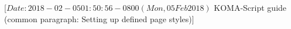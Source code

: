 %
%
%
%
%
%
%
%
% 
%
%
%
%

                 [$Date: 2018-02-05 01:50:56 -0800 (Mon, 05 Feb 2018) $
                  KOMA-Script guide (common paragraph: 
                                     Setting up defined page styles)]



